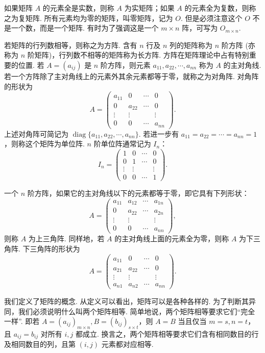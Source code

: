 \documentclass[UTF8, 12pt, fontset=fandol, oneside]{ctexart}
\begin{document}
如果矩阵 $A$ 的元素全是实数，则称 $A$ 为实矩阵；如果 $A$ 的元素全为复数，则称之为复矩阵. 所有元素均为零的矩阵，叫零矩阵，记为 $O$. 但是必须注意这个 $O$ 不是一个数，而是一个矩阵. 有时为了强调这是一个 $m\times n$ 阵，可写为 $O_{m\times n}$.

若矩阵的行列数相等，则称之为方阵. 含有 $n$ 行及 $n$ 列的矩阵称为 $n$ 阶方阵 (亦称为 $n$ 阶矩阵)，行列数不相等的矩阵称为长方阵. 方阵在矩阵理论中占有特别重要的位置. 若 $A=(a_{ij})$ 是 $n$ 阶方阵，则元素 $a_{11},a_{22},\cdots,a_{nn}$ 称为 $A$ 的主对角线. 若一个方阵除了主对角线上的元素外其余元素都等于零，就称之为对角阵. 对角阵的形状为
\[
A=
\left(\begin{array}{cccc}
a_{11} & 0 & \cdots & 0\\
0 & a_{22} & \cdots & 0\\
\vdots & \vdots & & \vdots\\
0 & 0 & \cdots & a_{nn}
\end{array}\right).
\]
上述对角阵可简记为 $\operatorname{diag}\{a_{11},a_{22},\cdots,a_{nn}\}$. 若进一步有 $a_{11}=a_{22}=\cdots=a_{nn}=1$，则称这个矩阵为单位阵. $n$ 阶单位阵通常记为 $I_n$：
\[
I_n=
\left(\begin{array}{cccc}
1 & 0 & \cdots & 0\\
0 & 1 & \cdots & 0\\
\vdots & \vdots & & \vdots\\
0 & 0 & \cdots & 1
\end{array}\right).
\]

一个 $n$ 阶方阵，如果它的主对角线以下的元素都等于零，即它具有下列形状：
\[
A=
\left(\begin{array}{cccc}
a_{11} & a_{12} & \cdots & a_{1n}\\
0 & a_{22} & \cdots & a_{2n}\\
\vdots & \vdots & & \vdots\\
0 & 0 & \cdots & a_{nn}
\end{array}\right),
\]
则称 $A$ 为上三角阵. 同样地，若 $A$ 的主对角线上面的元素全为零，则称 $A$ 为下三角阵. 下三角阵的形状为
\[
A=
\left(\begin{array}{cccc}
a_{11} & 0 & \cdots & 0\\
a_{21} & a_{22} & \cdots & 0\\
\vdots & \vdots & & \vdots\\
a_{n1} & a_{n2} & \cdots & a_{nn}
\end{array}\right).
\]

我们定义了矩阵的概念. 从定义可以看出，矩阵可以是各种各样的. 为了判断其异同，我们必须说明什么叫两个矩阵相等. 简单地说，两个矩阵相等要求它们``完全一样''. 即若 $A=(a_{ij})_{m\times n}, B=(b_{ij})_{s\times t}$，则 $A=B$ 当且仅当 $m=s,n=t$，且 $a_{ij}=b_{ij}$ 对所有 $i,j$ 都成立. 换言之，两个矩阵相等要求它们含有相同数目的行及相同数目的列，且第 $(i,j)$ 元素都对应相等.
\end{document}
